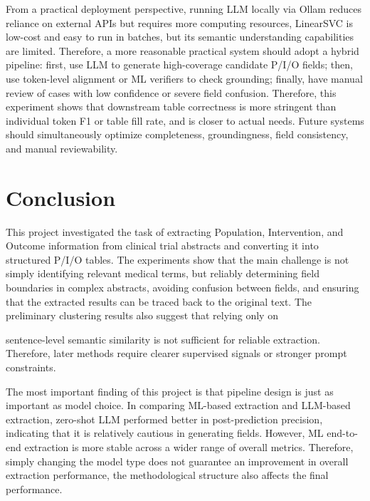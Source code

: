 \documentclass{article}
\begin{document}
From a practical deployment perspective, running LLM locally via Ollam reduces reliance on external APIs but requires more computing resources, LinearSVC is low-cost and easy to run in batches, but its semantic understanding capabilities are limited. Therefore, a more reasonable practical system should adopt a hybrid pipeline: first, use LLM to generate high-coverage candidate P/I/O fields; then, use token-level alignment or ML verifiers to check grounding; finally, have manual review of cases with low confidence or severe field confusion. Therefore, this experiment shows that downstream table correctness is more stringent than individual token F1 or table fill rate, and is closer to actual needs. Future systems should simultaneously optimize completeness, groundingness, field consistency, and manual reviewability.

\section{Conclusion}

This project investigated the task of extracting Population, Intervention, and Outcome information from clinical trial abstracts and converting it into structured P/I/O tables. The experiments show that the main challenge is not simply identifying relevant medical terms, but reliably determining field boundaries in complex abstracts, avoiding confusion between fields, and ensuring that the extracted results can be traced back to the original text. The preliminary clustering results also suggest that relying only on

sentence-level semantic similarity is not sufficient for reliable extraction. Therefore, later methods require clearer supervised signals or stronger prompt constraints.


The most important finding of this project is that pipeline design is just as important as model choice. In comparing ML-based extraction and LLM-based extraction, zero-shot LLM performed better in post-prediction precision, indicating that it is relatively cautious in generating fields. However, ML end-to-end extraction is more stable across a wider range of overall metrics. Therefore, simply changing the model type does not guarantee an improvement in overall extraction performance, the methodological structure also affects the final performance.
\end{document}
